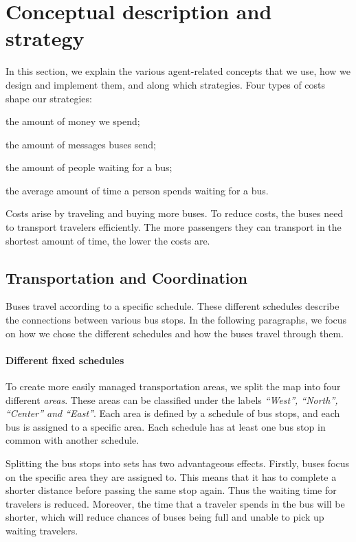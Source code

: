 \section{Conceptual description and strategy}
\label{sec:conceptual}

In this section, we explain the various agent-related concepts that we use, how we design and implement them, and along which strategies. Four types of costs shape our strategies:
\begin{enumerate*}[label=(\roman*)]
\item the amount of money we spend;
\item the amount of messages buses send;
\item the amount of people waiting for a bus;
\item the average amount of time a person spends waiting for a bus.
\end{enumerate*}

Costs arise by traveling and buying more buses. To reduce costs, the buses need to transport travelers efficiently. The more passengers they can transport in the shortest amount of time, the lower the costs are.

\subsection{Transportation and Coordination}

Buses travel according to a specific schedule. These different schedules describe the connections between various bus stops. In the following paragraphs, we focus on how we chose the different schedules and how the buses travel through them.
 
\paragraph{Different fixed schedules}

To create more easily managed transportation areas, we split the map into four different \textit{areas}. These areas can be classified under the labels \textit{``West'', ``North'', ``Center'' and ``East''}. Each area is defined by a schedule of bus stops, and each bus is assigned to a specific area. Each schedule has at least one bus stop in common with another schedule.

Splitting the bus stops into sets has two advantageous effects. Firstly, buses focus on the specific area they are assigned to. This means that it has to complete a shorter distance before passing the same stop again. Thus the waiting time for travelers is reduced. Moreover, the time that a traveler spends in the bus will be shorter, which will reduce chances of buses being full and unable to pick up waiting travelers.


